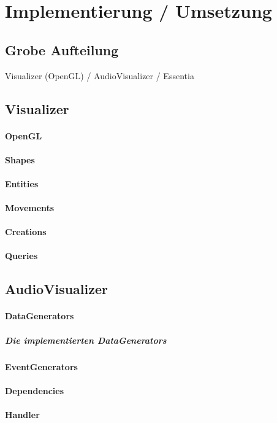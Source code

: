 \documentclass[11pt,a4paper]{article}
\begin{document}
\newpage

\section{Implementierung / Umsetzung}
\subsection{Grobe Aufteilung}
Visualizer (OpenGL) / AudioVisualizer / Essentia
\subsection{Visualizer}
\paragraph{OpenGL}
\paragraph{Shapes}
\paragraph{Entities}
\paragraph{Movements}
\paragraph{Creations}
\paragraph{Queries}
\subsection{AudioVisualizer}
\paragraph{DataGenerators}
\subparagraph{Die implementierten DataGenerators}
\paragraph{EventGenerators}
\paragraph{Dependencies}
\paragraph{Handler}
\end{document}
